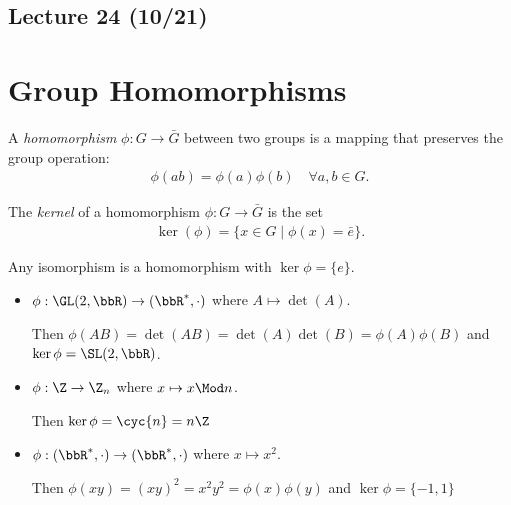 
\subsection*{Lecture 24 (10/21)} %
\section{Group Homomorphisms} %

\begin{definition}[homomorphism]
  A \emph{homomorphism} \(\phi: G\to \bar G\) between two groups is a mapping that preserves the group operation:
  \begin{align*}
      \phi(ab) = \phi(a)\phi(b)\quad \forall a,b\in G.
  \end{align*}
  \end{definition}

  \begin{definition}[kernel]
  The \emph{kernel} of a homomorphism \(\phi: G\to \bar G\) is the set
      \begin{align*}
          \ker(\phi) = \{x\in G \mid\phi(x)=\bar e\}.
      \end{align*}
  \end{definition}

  \begin{example}
      Any isomorphism is a homomorphism with \(\ker\phi=\{e\}\).
  \end{example}

  \begin{examples}
  \begin{itemize}
      \item \(\phi:\GL(2,\bbR)\to (\bbR^*, \cdot)\) where \(A\mapsto \det(A)\).

      Then \(\phi(AB) = \det(AB) = \det(A)\det(B) = \phi(A)\phi(B)\) and \(\ker\phi = \SL(2,\bbR)\).

      \item \(\phi: \Z \to \Z_n\) where \(x\mapsto x\Mod n\).

      Then \(\ker\phi = \cyc{n} = n\Z\)

      \item \(\phi: (\bbR^*, \cdot)\to (\bbR^*, \cdot)\) where \(x\mapsto x^2\).

      Then \(\phi(xy)=(xy)^2 = x^2y^2=\phi(x)\phi(y)\) and \(\ker\phi = \{-1, 1\}\)
  \end{itemize}
  \end{examples}

